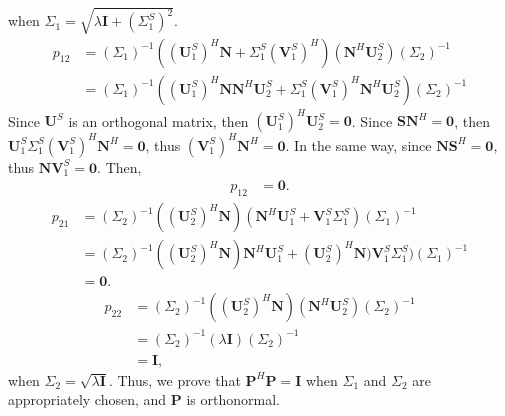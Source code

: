 when $\Sigma_1=\sqrt{\lambda\mathbf{I}+(\Sigma_1^S)^2}$.
\begin{equation}
\label{eq:p12}
\begin{split}
p_{12}&=(\Sigma_1)^{-1}((\mathbf{U}_1^S)^H\mathbf{N}+\Sigma_1^S(\mathbf{V}_1^S)^H) (\mathbf{N}^H\mathbf{U}_2^S)(\Sigma_2)^{-1} \\
&=(\Sigma_1)^{-1}((\mathbf{U}_1^S)^H\mathbf{N}\mathbf{N}^H\mathbf{U}_2^S + \Sigma_1^S(\mathbf{V}_1^S)^H\mathbf{N}^H\mathbf{U}_2^S  )(\Sigma_2)^{-1} 
\end{split}
\end{equation}
Since $\mathbf{U}^S$ is an orthogonal matrix, then $(\mathbf{U}_1^S)^H\mathbf{U}_2^S=\mathbf{0}$. Since $\mathbf{S}\mathbf{N}^H=\mathbf{0}$, then $\mathbf{U}_1^S\Sigma_1^S(\mathbf{V}_1^S)^H\mathbf{N}^H=\mathbf{0}$, thus $(\mathbf{V}_1^S)^H\mathbf{N}^H=\mathbf{0}$. In the same way, since $\mathbf{NS}^H=\mathbf{0}$,  thus $\mathbf{NV}_1^S=\mathbf{0}$.
Then, 
\begin{equation}
\label{eq:p122}
\begin{split}
p_{12}&=\mathbf{0}. 
\end{split}
\end{equation}
\begin{equation}
\label{eq:p21}
\begin{split}
p_{21}&=(\Sigma_2)^{-1}((\mathbf{U}_2^S)^H\mathbf{N}) (\mathbf{N}^H\mathbf{U}_1^S+\mathbf{V}_1^S\Sigma_1^S)(\Sigma_1)^{-1}\\
&=(\Sigma_2)^{-1}((\mathbf{U}_2^S)^H\mathbf{N})\mathbf{N}^H\mathbf{U}_1^S+(\mathbf{U}_2^S)^H\mathbf{N})\mathbf{V}_1^S\Sigma_1^S)(\Sigma_1)^{-1} \\
&=\mathbf{0}. 
\end{split}
\end{equation}
\begin{equation}
\label{eq:p22}
\begin{split}
p_{22}&=(\Sigma_2)^{-1}((\mathbf{U}_2^S)^H\mathbf{N}) (\mathbf{N}^H\mathbf{U}_2^S)(\Sigma_2)^{-1} \\
&=(\Sigma_2)^{-1}(\lambda\mathbf{I})(\Sigma_2)^{-1}\\
&=\mathbf{I},
\end{split}
\end{equation}
when $\Sigma_2=\sqrt{\lambda\mathbf{I}}$.
Thus, we prove that $\mathbf{P}^H\mathbf{P}=\mathbf{I}$ when $\Sigma_1$ and $\Sigma_2$ are appropriately chosen, and $\mathbf{P}$ is orthonormal. 


